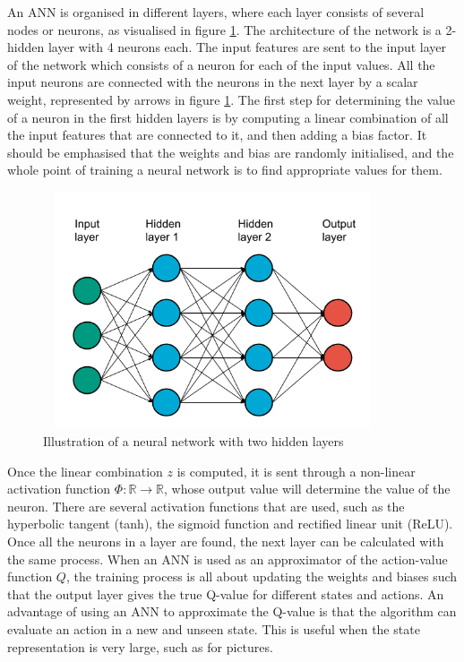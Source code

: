 \documentclass[class=book, crop=false, 11pt]{standalone}
\begin{document}
An ANN is organised in different layers, where each layer consists of several nodes or neurons, as visualised in figure \ref{fig:theory:neural_network}. The architecture of the network is a 2-hidden layer with 4 neurons each. The input features are sent to the input layer of the network which consists of a neuron for each of the input values. All the input neurons are connected with the neurons in the next layer by a scalar weight, represented by arrows in figure \ref{fig:theory:neural_network}. The first step for determining the value of a neuron in the first hidden layers is by computing a linear combination of all the input features that are connected to it, and then adding a bias factor. It should be emphasised that the weights and bias are randomly initialised, and the whole point of training a neural network is to find appropriate values for them.
\begin{figure}[ht!]
    \center
    \includegraphics[height=7cm, width=10cm]{figures/neural_network.png}
    \caption[size = 9]{Illustration of a neural network with two hidden layers}
    \label{fig:theory:neural_network}
\end{figure}
Once the linear combination $z$ is computed, it is sent through a non-linear activation function $\Phi: \mathbb{R} \to \mathbb{R}$, whose output value will determine the value of the neuron. There are several activation functions that are used, such as the hyperbolic tangent (tanh), the sigmoid function and rectified linear unit (ReLU).  Once all the neurons in a layer are found, the next layer can be calculated with the same process. When an ANN is used as an approximator of the action-value function $Q$, the training process is all about updating the weights and biases such that the output layer gives the true Q-value for different states and actions. An advantage of using an ANN to approximate the Q-value is that the algorithm can evaluate an action in a new and unseen state. This is useful when the state representation is very large, such as for pictures. 
\end{document}
